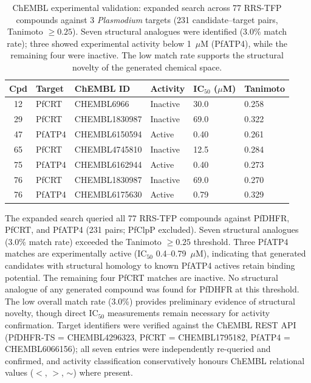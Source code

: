 \documentclass[11pt,a4paper]{article}
\begin{document}
\begin{table}[htbp]
\centering
\caption{ChEMBL experimental validation: expanded search across 77 RRS-TFP compounds against 3 \textit{Plasmodium} targets (231 candidate--target pairs, Tanimoto $\geq 0.25$). Seven structural analogues were identified (3.0\% match rate); three showed experimental activity below 1~$\mu$M (PfATP4), while the remaining four were inactive. The low match rate supports the structural novelty of the generated chemical space.}
\label{tab:chembl_validation}
\small
\begin{tabularx}{\textwidth}{c l l l l l}
\toprule
Cpd & Target & ChEMBL ID & Activity & {IC$_{50}$ ($\mu$M)} & Tanimoto \\
\midrule
12 & PfCRT & CHEMBL6966 & Inactive & 30.0 & 0.258 \\
29 & PfCRT & CHEMBL1830987 & Inactive & 69.0 & 0.322 \\
47 & PfATP4 & CHEMBL6150594 & Active & 0.40 & 0.261 \\
65 & PfCRT & CHEMBL4745810 & Inactive & 12.5 & 0.284 \\
75 & PfATP4 & CHEMBL6162944 & Active & 0.40 & 0.273 \\
76 & PfCRT & CHEMBL1830987 & Inactive & 69.0 & 0.270 \\
76 & PfATP4 & CHEMBL6175630 & Active & 0.79 & 0.329 \\
\bottomrule
\end{tabularx}
\vspace{1mm}
\footnotesize The expanded search queried all 77 RRS-TFP compounds against PfDHFR, PfCRT, and PfATP4 (231 pairs; PfClpP excluded). Seven structural analogues (3.0\% match rate) exceeded the Tanimoto $\geq 0.25$ threshold. Three PfATP4 matches are experimentally active (IC$_{50}$ 0.4--0.79~$\mu$M), indicating that generated candidates with structural homology to known PfATP4 actives retain binding potential. The remaining four PfCRT matches are inactive. No structural analogue of any generated compound was found for PfDHFR at this threshold. The low overall match rate (3.0\%) provides preliminary evidence of structural novelty, though direct IC$_{50}$ measurements remain necessary for activity confirmation. Target identifiers were verified against the ChEMBL REST API (PfDHFR-TS = CHEMBL4296323, PfCRT = CHEMBL1795182, PfATP4 = CHEMBL6066156); all seven entries were independently re-queried and confirmed, and activity classification conservatively honours ChEMBL relational values ($<$, $>$, $\sim$) where present.
\end{table}
\end{document}
